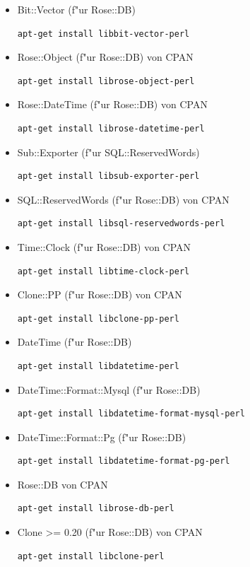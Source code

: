 \documentclass[11pt, twoside, a4paper, BCOR8mm, DIV12, bibtotoc,idxtotoc]{scrbook}
\begin{document}
\begin{itemize}
\item Bit::Vector (f"ur Rose::DB)
\begin{verbatim}
apt-get install libbit-vector-perl
\end{verbatim}
\item Rose::Object (f"ur Rose::DB) von CPAN
\begin{verbatim}
apt-get install librose-object-perl
\end{verbatim}
\item Rose::DateTime (f"ur Rose::DB) von CPAN
\begin{verbatim}
apt-get install librose-datetime-perl
\end{verbatim}
\item Sub::Exporter (f"ur SQL::ReservedWords)
\begin{verbatim}
apt-get install libsub-exporter-perl
\end{verbatim}
\item SQL::ReservedWords (f"ur Rose::DB) von CPAN
\begin{verbatim}
apt-get install libsql-reservedwords-perl
\end{verbatim}
\item Time::Clock (f"ur Rose::DB) von CPAN
\begin{verbatim}
apt-get install libtime-clock-perl
\end{verbatim}
\item Clone::PP (f"ur Rose::DB) von CPAN
\begin{verbatim}
apt-get install libclone-pp-perl
\end{verbatim}
\item DateTime (f"ur Rose::DB)
\begin{verbatim}
apt-get install libdatetime-perl
\end{verbatim}
\item DateTime::Format::Mysql (f"ur Rose::DB)
\begin{verbatim}
apt-get install libdatetime-format-mysql-perl
\end{verbatim}
\item DateTime::Format::Pg (f"ur Rose::DB)
\begin{verbatim}
apt-get install libdatetime-format-pg-perl
\end{verbatim}
\item Rose::DB von CPAN
\begin{verbatim}
apt-get install librose-db-perl
\end{verbatim}
\item Clone >= 0.20 (f"ur Rose::DB) von CPAN
\begin{verbatim}
apt-get install libclone-perl
\end{verbatim}


\end{itemize}
\end{document}
